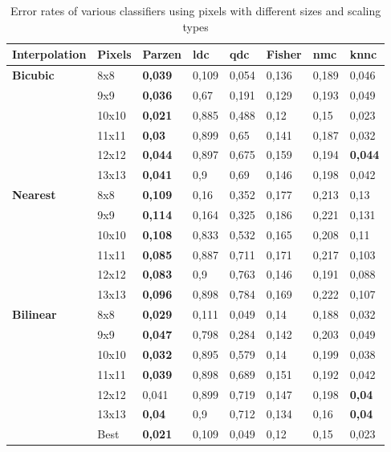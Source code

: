 \documentclass{article}
\begin{document}
\begin{table}[H]
  \small
  \centering
    \begin{tabular}{l|l|llllll|}
    \hline
    Interpolation & Pixels & Parzen & ldc   & qdc   & Fisher & nmc & knnc \\
		\hline
    \textbf{Bicubic} & 8x8   & \textbf{0,039} & 0,109 & 0,054 & 0,136 & 0,189 & 0,046 \\
    \textbf{} & 9x9   & \textbf{0,036} & 0,67  & 0,191 & 0,129 & 0,193 & 0,049 \\
    \textbf{} & 10x10 & \textbf{0,021} & 0,885 & 0,488 & 0,12  & 0,15  & 0,023 \\
    \textbf{} & 11x11 & \textbf{0,03} & 0,899 & 0,65  & 0,141 & 0,187 & 0,032 \\
    \textbf{} & 12x12 & \textbf{0,044} & 0,897 & 0,675 & 0,159 & 0,194 & \textbf{0,044} \\
    \textbf{} & 13x13 & \textbf{0,041} & 0,9   & 0,69  & 0,146 & 0,198 & 0,042 \\
		\hline
    \textbf{Nearest} & 8x8   & \textbf{0,109} & 0,16  & 0,352 & 0,177 & 0,213 & 0,13 \\
    \textbf{} & 9x9   & \textbf{0,114} & 0,164 & 0,325 & 0,186 & 0,221 & 0,131 \\
    \textbf{} & 10x10 & \textbf{0,108} & 0,833 & 0,532 & 0,165 & 0,208 & 0,11 \\
    \textbf{} & 11x11 & \textbf{0,085} & 0,887 & 0,711 & 0,171 & 0,217 & 0,103 \\
    \textbf{} & 12x12 & \textbf{0,083} & 0,9   & 0,763 & 0,146 & 0,191 & 0,088 \\
    \textbf{} & 13x13 & \textbf{0,096} & 0,898 & 0,784 & 0,169 & 0,222 & 0,107 \\
		\hline
    \textbf{Bilinear} & 8x8   & \textbf{0,029} & 0,111 & 0,049 & 0,14  & 0,188 & 0,032 \\
    \textbf{} & 9x9   & \textbf{0,047} & 0,798 & 0,284 & 0,142 & 0,203 & 0,049 \\
    \textbf{} & 10x10 & \textbf{0,032} & 0,895 & 0,579 & 0,14  & 0,199 & 0,038 \\
    \textbf{} & 11x11 & \textbf{0,039} & 0,898 & 0,689 & 0,151 & 0,192 & 0,042 \\
    \textbf{} & 12x12 & 0,041 & 0,899 & 0,719 & 0,147 & 0,198 & \textbf{0,04} \\
    \textbf{} & 13x13 & \textbf{0,04} & 0,9   & 0,712 & 0,134 & 0,16  & \textbf{0,04} \\
		\hline
    \textbf{} & Best  & \textbf{0,021} & 0,109 & 0,049 & 0,12  & 0,15  & 0,023 \\
    \hline
    \end{tabular}%
		\caption{Error rates of various classifiers using pixels with different sizes and scaling types 
		\label{table:results-only-pixels}}
\end{table}
\end{document}
